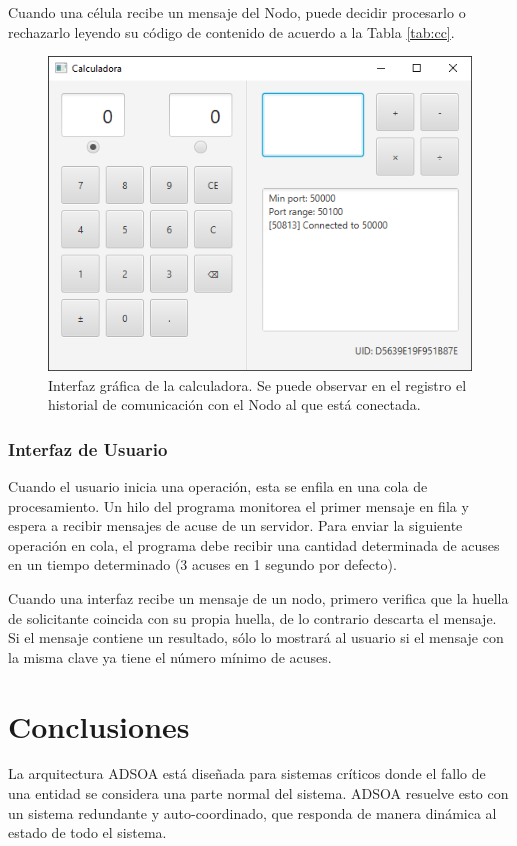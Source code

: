 \documentclass[conference,compsoc]{IEEEtran}
\begin{document}
Cuando una célula recibe un mensaje del Nodo, puede decidir procesarlo o rechazarlo leyendo su código de contenido de acuerdo a la Tabla \ref{tab:cc}.

\begin{figure}[hbt]
    \centering
    \includegraphics[width=0.9\columnwidth]{demo.png}
    \caption{Interfaz gráfica de la calculadora. Se puede observar en el registro el historial de comunicación con el Nodo al que está conectada.}
    \label{fig:demo}
\end{figure}

\subsubsection{Interfaz de Usuario}

Cuando el usuario inicia una operación, esta se enfila en una cola de procesamiento. Un hilo del programa monitorea el primer mensaje en fila y espera a recibir mensajes de acuse de un servidor. Para enviar la siguiente operación en cola, el programa debe recibir una cantidad determinada de acuses en un tiempo determinado (3 acuses en 1 segundo por defecto).

Cuando una interfaz recibe un mensaje de un nodo, primero verifica que la huella de solicitante coincida con su propia huella, de lo contrario descarta el mensaje.
Si el mensaje contiene un resultado, sólo lo mostrará al usuario si el mensaje con la misma clave ya tiene el número mínimo de acuses.

\section{Conclusiones}

La arquitectura ADSOA está diseñada para sistemas críticos donde el fallo de una entidad se considera una parte normal del sistema. ADSOA resuelve esto con un sistema redundante y auto-coordinado, que responda de manera dinámica al estado de todo el sistema.

\printbibliography
\end{document}
